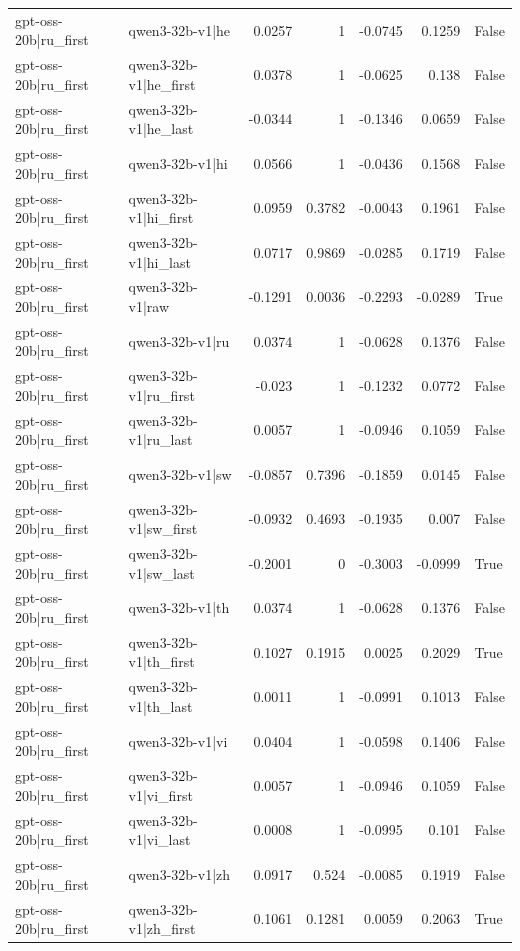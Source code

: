 \begin{table}
\begin{tabular}{l l r r r r l}
gpt-oss-20b|ru_first & qwen3-32b-v1|he & 0.0257 & 1 & -0.0745 & 0.1259 & False \\
gpt-oss-20b|ru_first & qwen3-32b-v1|he_first & 0.0378 & 1 & -0.0625 & 0.138 & False \\
gpt-oss-20b|ru_first & qwen3-32b-v1|he_last & -0.0344 & 1 & -0.1346 & 0.0659 & False \\
gpt-oss-20b|ru_first & qwen3-32b-v1|hi & 0.0566 & 1 & -0.0436 & 0.1568 & False \\
gpt-oss-20b|ru_first & qwen3-32b-v1|hi_first & 0.0959 & 0.3782 & -0.0043 & 0.1961 & False \\
gpt-oss-20b|ru_first & qwen3-32b-v1|hi_last & 0.0717 & 0.9869 & -0.0285 & 0.1719 & False \\
gpt-oss-20b|ru_first & qwen3-32b-v1|raw & -0.1291 & 0.0036 & -0.2293 & -0.0289 & True \\
gpt-oss-20b|ru_first & qwen3-32b-v1|ru & 0.0374 & 1 & -0.0628 & 0.1376 & False \\
gpt-oss-20b|ru_first & qwen3-32b-v1|ru_first & -0.023 & 1 & -0.1232 & 0.0772 & False \\
gpt-oss-20b|ru_first & qwen3-32b-v1|ru_last & 0.0057 & 1 & -0.0946 & 0.1059 & False \\
gpt-oss-20b|ru_first & qwen3-32b-v1|sw & -0.0857 & 0.7396 & -0.1859 & 0.0145 & False \\
gpt-oss-20b|ru_first & qwen3-32b-v1|sw_first & -0.0932 & 0.4693 & -0.1935 & 0.007 & False \\
gpt-oss-20b|ru_first & qwen3-32b-v1|sw_last & -0.2001 & 0 & -0.3003 & -0.0999 & True \\
gpt-oss-20b|ru_first & qwen3-32b-v1|th & 0.0374 & 1 & -0.0628 & 0.1376 & False \\
gpt-oss-20b|ru_first & qwen3-32b-v1|th_first & 0.1027 & 0.1915 & 0.0025 & 0.2029 & True \\
gpt-oss-20b|ru_first & qwen3-32b-v1|th_last & 0.0011 & 1 & -0.0991 & 0.1013 & False \\
gpt-oss-20b|ru_first & qwen3-32b-v1|vi & 0.0404 & 1 & -0.0598 & 0.1406 & False \\
gpt-oss-20b|ru_first & qwen3-32b-v1|vi_first & 0.0057 & 1 & -0.0946 & 0.1059 & False \\
gpt-oss-20b|ru_first & qwen3-32b-v1|vi_last & 0.0008 & 1 & -0.0995 & 0.101 & False \\
gpt-oss-20b|ru_first & qwen3-32b-v1|zh & 0.0917 & 0.524 & -0.0085 & 0.1919 & False \\
gpt-oss-20b|ru_first & qwen3-32b-v1|zh_first & 0.1061 & 0.1281 & 0.0059 & 0.2063 & True \\

\end{tabular}
\end{table}
